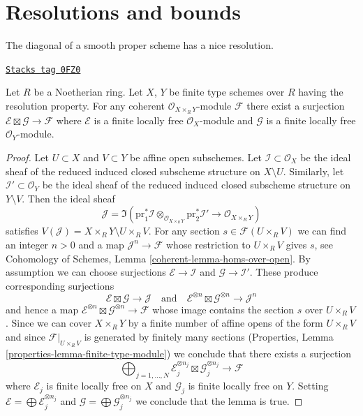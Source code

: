\section{Resolutions and bounds}
\label{equiv-section-tricks-smooth}
The diagonal of a smooth proper scheme has a nice resolution.

\begin{lemma}[On product]
\label{equiv-lemma-on-product}
\href{https://stacks.math.columbia.edu/tag/0FZ0}{\texttt{Stacks tag 0FZ0}}

Let $R$ be a Noetherian ring. Let $X$, $Y$ be finite type schemes over $R$
having the resolution property. For any coherent
$\mathcal{O}_{X \times_R Y}$-module $\mathcal{F}$ there exist
a surjection $\mathcal{E} \boxtimes \mathcal{G} \to \mathcal{F}$
where $\mathcal{E}$ is a finite locally free $\mathcal{O}_X$-module
and $\mathcal{G}$ is a finite locally free $\mathcal{O}_Y$-module.
\end{lemma}

\begin{proof}
Let $U \subset X$ and $V \subset Y$ be affine open subschemes. Let
$\mathcal{I} \subset \mathcal{O}_X$ be the ideal sheaf of the
reduced induced closed subscheme structure on $X \setminus U$.
Similarly, let $\mathcal{I}' \subset \mathcal{O}_Y$ be the ideal sheaf of the
reduced induced closed subscheme structure on $Y \setminus V$.
Then the ideal sheaf
$$
\mathcal{J} = \Im(\text{pr}_1^*\mathcal{I} \otimes_{\mathcal{O}_{X \times_R Y}}
\text{pr}_2^*\mathcal{I}' \to \mathcal{O}_{X \times_R Y})
$$
satisfies $V(\mathcal{J}) = X \times_R Y \setminus U \times_R V$.
For any section $s \in \mathcal{F}(U \times_R V)$ we can find an integer
$n > 0$ and a map $\mathcal{J}^n \to \mathcal{F}$ whose restriction to
$U \times_R V$ gives $s$, see
Cohomology of Schemes, Lemma \ref{coherent-lemma-homs-over-open}.
By assumption we can choose surjections
$\mathcal{E} \to \mathcal{I}$ and $\mathcal{G} \to \mathcal{I}'$.
These produce corresponding surjections
$$
\mathcal{E} \boxtimes \mathcal{G} \to \mathcal{J}
\quad\text{and}\quad
\mathcal{E}^{\otimes n} \boxtimes \mathcal{G}^{\otimes n} \to \mathcal{J}^n
$$
and hence a map
$\mathcal{E}^{\otimes n} \boxtimes \mathcal{G}^{\otimes n} \to \mathcal{F}$
whose image contains the section $s$ over $U \times_R V$.
Since we can cover $X \times_R Y$ by a finite number of affine opens
of the form $U \times_R V$ and since $\mathcal{F}|_{U \times_R V}$
is generated by finitely many sections (Properties, Lemma
\ref{properties-lemma-finite-type-module})
we conclude that there exists a surjection
$$
\bigoplus\nolimits_{j = 1, \ldots, N}
\mathcal{E}_j^{\otimes n_j} \boxtimes \mathcal{G}_j^{\otimes n_j}
\to \mathcal{F}
$$
where $\mathcal{E}_j$ is finite locally free on $X$ and
$\mathcal{G}_j$ is finite locally free on $Y$.
Setting $\mathcal{E} = \bigoplus \mathcal{E}_j^{\otimes n_j}$
and $\mathcal{G} = \bigoplus \mathcal{G}_j^{\otimes n_j}$
we conclude that the lemma is true.
\end{proof}


